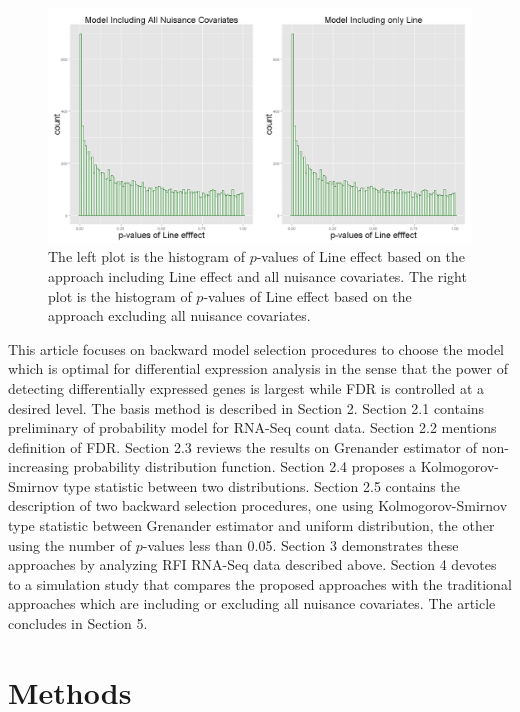 \documentclass[12pt, letter]{article}\usepackage[]{graphicx}\usepackage[]{color}
\begin{document}
\begin{figure}[H]
\centering
\includegraphics[scale = 0.22]{intro_plot.png}
\caption{The left plot is the histogram of $p$-values of Line effect based on the approach including Line effect and all nuisance covariates. The right plot is the histogram of $p$-values of Line effect based on the approach excluding all nuisance covariates.}
\label{figure1}
\end{figure}

This article focuses on backward model selection procedures to  choose the model which is  optimal for differential expression analysis in the sense that the power of detecting differentially expressed genes is largest while FDR is controlled at a desired level. The basis method is described in Section 2. Section 2.1 contains preliminary of probability model for RNA-Seq count data. Section 2.2 mentions definition of FDR.  Section 2.3 reviews the results on Grenander estimator of non-increasing probability distribution function. Section 2.4 proposes a Kolmogorov-Smirnov  type statistic between two distributions. Section 2.5 contains the description of two backward selection procedures, one using Kolmogorov-Smirnov  type statistic between Grenander estimator and uniform distribution, the other using the number of $p$-values less than 0.05. Section 3 demonstrates these approaches by analyzing RFI RNA-Seq data described above. Section 4 devotes to a simulation study that compares the proposed approaches with the traditional approaches which are including or excluding all nuisance covariates. The article concludes in Section 5. 
\section{ Methods}
\end{document}
